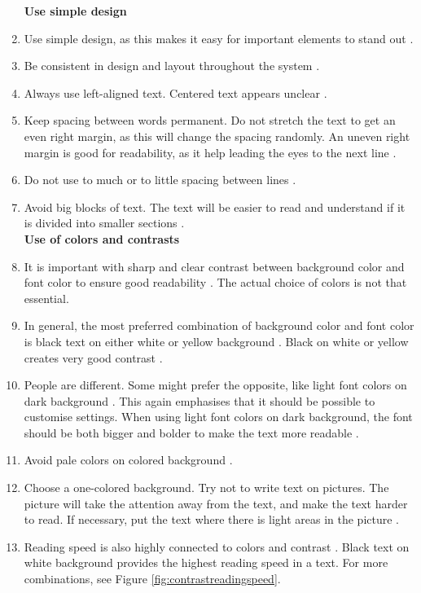 \begin{enumerate}[{o}.1]
\textbf{Use simple design}

\item Use simple design, as this makes it easy for important elements to stand out \cite{actionforblindpeopleTekst}.
\item Be consistent in design and layout throughout the system \cite{actionforblindpeopleTekst}.
\item Always use left-aligned text. Centered text appears unclear \cite{actionforblindpeopleTekst}.  
\item Keep spacing between words permanent. Do not stretch the text to get an even right margin, as this will change the spacing randomly. An uneven right margin is good for readability, as it help leading the eyes to the next line \cite{blindeforbundetTekst} \cite{actionforblindpeopleTekst}.
\item Do not use to much or to little spacing between lines \cite{blindeforbundetTekst} \cite{actionforblindpeopleTekst}. 
\item Avoid big blocks of text. The text will be easier to read and understand if it is divided into smaller sections \cite{blindeforbundetTekst} \cite{actionforblindpeopleTekst} \cite{evengrounds}. \\  


\textbf{Use of colors and contrasts}
\item It is important with sharp and clear contrast between background color and font color to ensure good readability \cite{blindeforbundetTekst} \cite{actionforblindpeopleTekst}. The actual choice of colors is not that essential.   
\item In general, the most preferred combination of background color and font color is black text on either white or yellow background \cite{actionforblindpeopleTekst}. Black on white or yellow creates very good contrast \cite{blindeforbundetTekst}. 
\item People are different. Some might prefer the opposite, like light font colors on dark background \cite{blindeforbundetTekst}. This again emphasises that it should be possible to customise settings. When using light font colors on dark background, the font should be both bigger and bolder to make the text more readable \cite{actionforblindpeopleTekst}.
\item Avoid pale colors on colored background \cite{blindeforbundetTekst}.  
\item Choose a one-colored background. Try not to write text on pictures. The picture will take the attention away from the text, and make the text harder to read. If necessary, put the text where there is light areas in the picture  \cite{blindeforbundetTekst}.  
\item Reading speed is also highly connected to colors and contrast  \cite{blindeforbundetTekst}. Black text on white background provides the highest reading speed in a text. For more combinations, see Figure \ref{fig:contrastreadingspeed}.


\end{enumerate}
